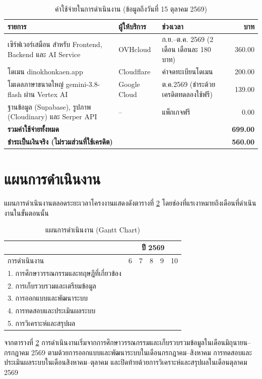 \nopagebreak
\begin{table}[H]
\centering
\caption{ค่าใช้จ่ายในการดำเนินงาน (ข้อมูลถึงวันที่ 15 ตุลาคม 2569)}
\label{tab:cost}
\begin{tabular}{|p{4.6cm}|p{2.4cm}|p{4.2cm}|r|}
\hline
\textbf{รายการ} & \textbf{ผู้ให้บริการ} & \textbf{ช่วงเวลา} & \textbf{บาท} \\
\hline
เซิร์ฟเวอร์เสมือน สำหรับ Frontend, Backend และ AI Service & OVHcloud & ก.ย.--ต.ค. 2569 (2 เดือน เดือนละ 180 บาท) & 360.00 \\ \hline
โดเมน dinokhonkaen.app & Cloudflare & ค่าจดทะเบียนโดเมน & 200.00 \\ \hline
โมเดลภาษาขนาดใหญ่ gemini-3.8-flash ผ่าน Vertex AI & Google Cloud & ต.ค.2569 (ชำระด้วยเครดิตทดลองใช้ฟรี) & 139.00 \\ \hline
ฐานข้อมูล (Supabase), รูปภาพ (Cloudinary) และ Serper API & -- & แพ็กเกจฟรี & 0.00 \\ \hline
\multicolumn{3}{|l|}{\textbf{รวมค่าใช้จ่ายทั้งหมด}} & \textbf{699.00} \\ \hline
\multicolumn{3}{|l|}{\textbf{ชำระเป็นเงินจริง (ไม่รวมส่วนที่ใช้เครดิต)}} & \textbf{560.00} \\ \hline
\end{tabular}
\end{table}

\section{แผนการดำเนินงาน}

แผนการดำเนินงานตลอดระยะเวลาโครงงานแสดงดังตารางที่ \ref{tab:gantt} โดยช่องที่แรเงาหมายถึงเดือนที่ดำเนินงานในขั้นตอนนั้น

\nopagebreak
\begin{table}[H]
\centering
\caption{แผนการดำเนินงาน (Gantt Chart)}
\label{tab:gantt}
\begin{tabular}{|p{5.5cm}|c|c|c|c|c|}
\hline
 & \multicolumn{5}{c|}{ปี 2569} \\
\hline
การดำเนินงาน & 6 & 7 & 8 & 9 & 10 \\
\hline
1. การศึกษาวรรณกรรมและทฤษฎีที่เกี่ยวข้อง
 & \cellcolor{gray!60} & & & & \\
\hline
2. การเก็บรวบรวมและเตรียมข้อมูล
 & \cellcolor{gray!60} & \cellcolor{gray!60} & & & \\
\hline
3. การออกแบบและพัฒนาระบบ
 & & \cellcolor{gray!60} & \cellcolor{gray!60} & & \\
\hline
4. การทดสอบและประเมินผลระบบ
 & & & \cellcolor{gray!60} & \cellcolor{gray!60} & \cellcolor{gray!60} \\
\hline
5. การวิเคราะห์และสรุปผล
 & & & & & \cellcolor{gray!60} \\
\hline
\end{tabular}
\end{table}

จากตารางที่ \ref{tab:gantt} การดำเนินงานเริ่มจากการศึกษาวรรณกรรมและเก็บรวบรวมข้อมูลในเดือนมิถุนายน--กรกฎาคม 2569 ตามด้วยการออกแบบและพัฒนาระบบในเดือนกรกฎาคม--สิงหาคม การทดสอบและประเมินผลระบบในเดือนสิงหาคม--ตุลาคม และปิดท้ายด้วยการวิเคราะห์และสรุปผลในเดือนตุลาคม 2569